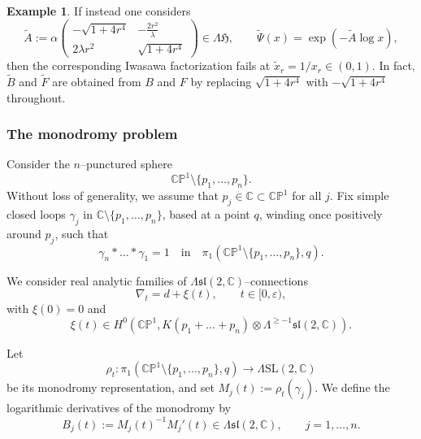 \documentclass[12pt,a4paper]{amsart}
\theoremstyle{definition}
\newtheorem{example}[theorem]{Example}
\theoremstyle{remark}
\newcommand{\C}{\mathbb C}
\newcommand{\CP}{\mathbb{CP}}
\begin{document}
\begin{example}
If instead one considers
\[
\tilde A
:=
\alpha
\begin{pmatrix}
 -\sqrt{1+4 r^4}  & -\frac{2 r^2}{\lambda } \\
 2 \lambda r^2 & \sqrt{1+4 r^4}
\end{pmatrix}
\in \Lambda\mathfrak H,
\qquad
\tilde\Psi(x)=\exp(-\tilde A\log x),
\]
then the corresponding Iwasawa factorization fails at
$\tilde x_r=1/x_r\in(0,1)$.
In fact, $\tilde B$ and $\tilde F$ are obtained from $B$ and $F$ by replacing
$\sqrt{1+4r^4}$ with $-\sqrt{1+4r^4}$ throughout.
\end{example}



\subsubsection*{The monodromy problem}

Consider the $n$--punctured sphere
\[
\CP^1\setminus\{p_1,\dots,p_n\}.
\]
Without loss of generality, we assume that $p_j\in\C\subset\CP^1$ for all $j$.
Fix simple closed loops $\gamma_j$ in $\C\setminus\{p_1,\dots,p_n\}$,
based at a point $q$, winding once positively around $p_j$, such that
\[
\gamma_n*\dots*\gamma_1=1
\quad\text{in}\quad
\pi_1(\CP^1\setminus\{p_1,\dots,p_n\},q).
\]



We consider real analytic families of $\Lambda\mathfrak{sl}(2,\C)$--connections
\[
\nabla_t = d+\xi(t),
\qquad t\in[0,\varepsilon),
\]
with $\xi(0)=0$ and
\[
\xi(t)\in H^0\!\left(\CP^1,
K(p_1+\dots+p_n)\otimes \Lambda^{\geq-1}\mathfrak{sl}(2,\C)\right).
\]


Let
\[
\rho_t\colon \pi_1(\CP^1\setminus\{p_1,\dots,p_n\},q)\to \Lambda\mathrm{SL}(2,\C)
\]
be its monodromy representation, and set $M_j(t):=\rho_t(\gamma_j)$.
We define the logarithmic derivatives of the monodromy by
\[
B_j(t)
:=
M_j(t)^{-1}M_j'(t)
\in \Lambda\mathfrak{sl}(2,\C),
\qquad j=1,\dots,n.
\]
\end{document}
